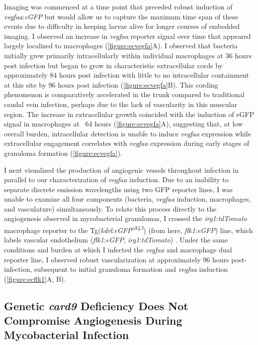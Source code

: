 Imaging was commenced at a time point that preceded robust induction of \textit{vegfaa}:\textit{eGFP} but would allow us to capture the maximum time span of these events due to difficulty in keeping larvae alive for longer courses of embedded imaging. I observed an increase in \textit{vegfaa} reporter signal over time that appeared largely localized to macrophages (\autoref{figure:ecvegfa}A). I observed that bacteria initially grew primarily intracellularly within individual macrophages at 36 hours post infection but began to grow in characteristic extracellular cords by approximately 84 hours post infection with little to no intracellular containment at this site by 96 hours post infection (\autoref{figure:ecvegfa}B). This cording phenomenon is comparatively accelerated in the trunk compared to traditional caudal vein infection, perhaps due to the lack of vascularity in this muscular region. The increase in extracellular growth coincided with the induction of eGFP signal in macrophages at ~64 hours (\autoref{figure:ecvegfa}A), suggesting that, at low overall burden, intracellular detection is unable to induce \textit{vegfaa} expression while extracellular engagement correlates with \textit{vegfaa} expression during early stages of granuloma formation (\autoref{figure:ecvegfa}). 

I next visualized the production of angiogenic vessels throughout infection in parallel to our characterization of \textit{vegfaa} induction. Due to an inability to separate discrete emission wavelengths using two GFP reporter lines, I was unable to examine all four components (bacteria, \textit{vegfaa} induction, macrophages, and vasculature) simultaneously. To relate this process directly to the angiogenesis observed in mycobacterial granulomas, I crossed the \textit{irg1}:\textit{tdTomato} macrophage reporter to the Tg(\textit{kdrl}:\textit{eGFP\textsuperscript{s843}}) (from here, \textit{flk1}:\textit{eGFP}) line, which labels vascular endothelium (\textit{flk1}:\textit{eGFP}; \textit{irg1}:\textit{tdTomato}) \citep{Jin2005}. Under the same conditions and burden at which I infected the \textit{vegfaa} and macrophage dual reporter line, I observed robust vascularization at approximately 96 hours post\hyp{}infection, subsequent to initial granuloma formation and \textit{vegfaa} induction (\autoref{figure:ecflk1}A, B). 

\subsection{Genetic \textit{card9} Deficiency Does Not Compromise Angiogenesis During Mycobacterial Infection}

